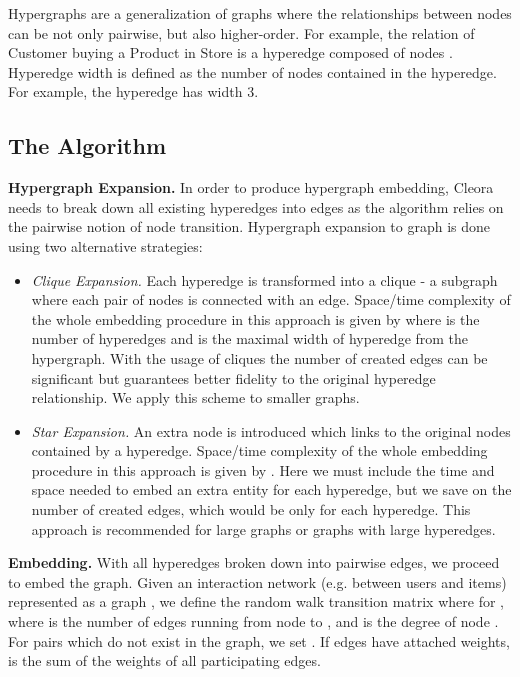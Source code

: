 \documentclass{IEEEtran}
\begin{document}
Hypergraphs are a generalization of graphs where the relationships between nodes can be not only pairwise, but also higher-order. For example, the relation of Customer  buying a Product  in Store  is a hyperedge composed of nodes . Hyperedge width  is defined as the number of nodes contained in the hyperedge. For example, the hyperedge  has width 3.

\subsection{The Algorithm}

\textbf{Hypergraph Expansion.} 
  In order to produce hypergraph embedding, Cleora needs to break down all existing hyperedges into edges as the algorithm relies on the pairwise notion of node transition. Hypergraph expansion to graph is done using two alternative strategies:
\begin{itemize}
    \item \textit{Clique Expansion.} Each hyperedge is transformed into a clique - a subgraph where each pair of nodes is connected with an edge. Space/time complexity of the whole embedding procedure in this approach is given by  where  is the number of hyperedges and  is the maximal width of hyperedge from the hypergraph. With the usage of cliques the number of created edges can be significant but guarantees better fidelity to the original hyperedge relationship. We apply this scheme to smaller graphs.
    \item \textit{Star Expansion.} An extra node is introduced which links to the original nodes contained by a hyperedge. Space/time complexity of the whole embedding procedure in this approach is given by . Here we must include the time and space needed to embed an extra entity for each hyperedge, but we save on the number of created edges, which would be only  for each hyperedge. This approach is recommended for large graphs or graphs with large hyperedges.
\end{itemize}


\textbf{Embedding.} With all hyperedges broken down into pairwise edges, we proceed to embed the graph. Given an interaction network (e.g. between users and items) represented as a graph
, we define the random walk transition matrix  where  for , where  is the
number of edges running from node  to , and  is the degree of node . For  pairs which do not exist in the graph, we set .
If edges have attached weights,  is the sum of the weights of all participating edges. 
\end{document}
